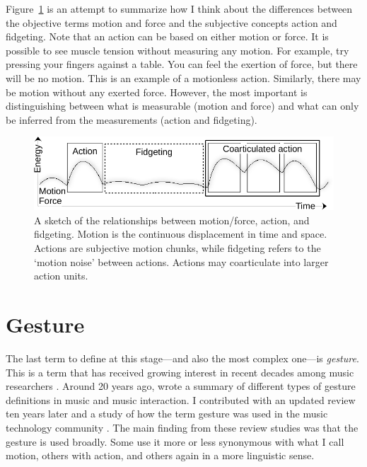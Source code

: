 Figure~\ref{fig:fidgeting} is an attempt to summarize how I think about the differences between the objective terms motion and force and the subjective concepts action and fidgeting. Note that an action can be based on either motion or force. It is possible to see muscle tension without measuring any motion. For example, try pressing your fingers against a table. You can feel the exertion of force, but there will be no motion. This is an example of a motionless action. Similarly, there may be motion without any exerted force. However, the most important is distinguishing between what is measurable (motion and force) and what can only be inferred from the measurements (action and fidgeting).

\begin{figure}[tp]
\includegraphics[width=1\columnwidth]{figures/22-fidgeting-crop.pdf}
\caption{A sketch of the relationships between motion/force, action, and fidgeting. Motion is the continuous displacement in time and space. Actions are subjective motion chunks, while fidgeting refers to the `motion noise' between actions. Actions may coarticulate into larger action units.}
\label{fig:fidgeting}
\end{figure}


\section{Gesture}

The last term to define at this stage---and also the most complex one---is  \emph{gesture}. %
This is a term that has received growing interest in recent decades among music researchers \citep{gritten_music_2006,gritten_new_2011}. Around 20 years ago, \citet{cadoz_gesture-music_2000} wrote a summary of different types of gesture definitions in music and music interaction. I contributed with an updated review ten years later \citep{jensenius_musical_2010} and a study of how the term gesture was used in the music technology community \citep{jensenius_gesture_2014}.
The main finding from these review studies was that the gesture is used broadly. Some use it more or less synonymous with what I call motion, others with action, and others again in a more linguistic sense.


